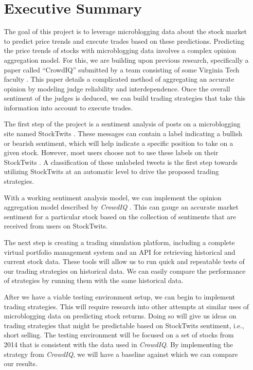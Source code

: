
\section{Executive Summary}

The goal of this project is to leverage microblogging data about the stock market to predict price trends and execute trades based on these predictions.
Predicting the price trends of stocks with microblogging data involves a complex opinion aggregation model.
For this, we are building upon previous research, specifically a paper called ``CrowdIQ'' submitted by a team consisting of some Virginia Tech faculty \cite{crowdiq}.
This paper details a complicated method of aggregating an accurate opinion by modeling judge reliability and interdependence.
Once the overall sentiment of the judges is deduced, we can build trading strategies that take this information into account to execute trades.

The first step of the project is a sentiment analysis of posts on a microblogging site named StockTwits \cite{stocktwits}.
These messages can contain a label indicating a bullish or bearish sentiment, which will help indicate a specific position to take on a given stock.
However, most users choose not to use these labels on their StockTwits \cite{crowdiq}.
A classification of these unlabeled tweets is the first step towards utilizing StockTwits at an automatic level to drive the proposed trading strategies.

With a working sentiment analysis model, we can implement the opinion aggregation model described by \textit{CrowdIQ} \cite{crowdiq}.
This can gauge an accurate market sentiment for a particular stock based on the collection of sentiments that are received from users on StockTwits.

The next step is creating a trading simulation platform, including a complete virtual portfolio management system and an API for retrieving historical and current stock data.
These tools will allow us to run quick and repeatable tests of our trading strategies on historical data.
We can easily compare the performance of strategies by running them with the same historical data.

After we have a viable testing environment setup, we can begin to implement trading strategies.
This will require research into other attempts at similar uses of microblogging data on predicting stock returns.
Doing so will give us ideas on trading strategies that might be predictable based on StockTwits sentiment, i.e., short selling.
The testing environment will be focused on a set of stocks from 2014 that is consistent with the data used in \textit{CrowdIQ}.
By implementing the strategy from \textit{CrowdIQ}, we will have a baseline against which we can compare our results.


